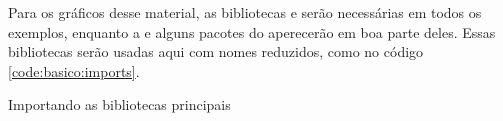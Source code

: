 Para os gráficos desse material, as bibliotecas \pandas e \matplotlib serão necessárias em todos os exemplos, enquanto a \numpy e alguns pacotes do \scipy aperecerão em boa parte deles. Essas bibliotecas serão usadas aqui com nomes reduzidos, como no código \ref{code:basico:imports}.

\begin{listing}[H]
    \caption{Importando as bibliotecas principais}
    \label{code:basico:imports}

\end{listing}
